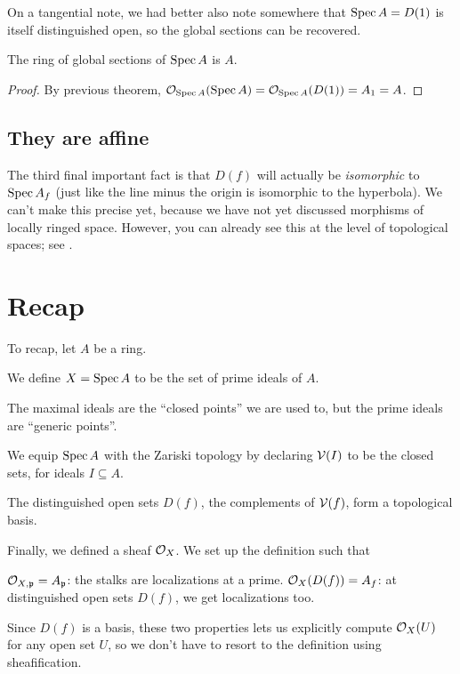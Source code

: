 On a tangential note,
we had better also note somewhere that $\operatorname{Spec} A = D(1)$
is itself distinguished open, so the global sections can be recovered.
\begin{corollary}
	The ring of global sections of $\operatorname{Spec} A$ is $A$.
\end{corollary}
\begin{proof}
	By previous theorem, $\mathcal O_{\operatorname{Spec} A}(\operatorname{Spec} A)
	= \mathcal O_{\operatorname{Spec} A}(D(1)) = A_1 = A$.
\end{proof}

\subsection{They are affine}
The third final important fact is that
$D(f)$ will actually be \emph{isomorphic} to $\operatorname{Spec} A_f$
(just like the line minus the origin is isomorphic to the hyperbola).
We can't make this precise yet,
because we have not yet discussed morphisms of locally ringed space.
However, you can already see this at the level of topological spaces;
see .

\section{Recap}
To recap, let $A$ be a ring.
\begin{itemize}
	\ii We define $X = \operatorname{Spec} A$ to be the set of prime ideals of $A$.
	\begin{itemize}
		\ii The maximal ideals are the ``closed points'' we are used to,
		but the prime ideals are ``generic points''.
	\end{itemize}

	\ii We equip $\operatorname{Spec} A$ with the Zariski topology by declaring
	$\mathcal V(I)$ to be the closed sets, for ideals $I \subseteq A$.
	\begin{itemize}
		\ii The distinguished open sets $D(f)$,
		the complements of $\mathcal V(f)$, form a topological basis.
	\end{itemize}

	\ii Finally, we defined a sheaf $\mathcal O_X$.
	We set up the definition such that
	\begin{itemize}
		\ii $\mathcal O_{X,\mathfrak p} = A_\mathfrak p$:
		the stalks are localizations at a prime.
		\ii $\mathcal O_{X}(D(f)) = A_f$:
		at distinguished open sets $D(f)$,
		we get localizations too.
	\end{itemize}
	Since $D(f)$ is a basis,
	these two properties lets us explicitly compute $\mathcal O_X(U)$
	for any open set $U$,
	so we don't have to resort to the definition using sheafification.
\end{itemize}

